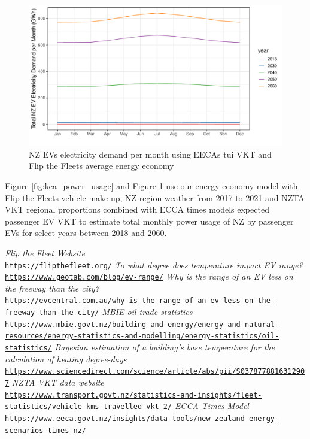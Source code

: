 \documentclass[
]{article}
\begin{document}
\begin{figure}
\centering
\includegraphics{final_report_files/figure-latex/tui_power_usage-1.pdf}
\caption{NZ EVs electricity demand per month using EECAs tui VKT and
Flip the Fleets average energy economy\label{fig:tui_power_usage}}
\end{figure}

Figure \ref{fig:kea_power_usage} and Figure \ref{fig:tui_power_usage}
use our energy economy model with Flip the Fleets vehicle make up, NZ
region weather from 2017 to 2021 and NZTA VKT regional proportions
combined with ECCA times models expected passenger EV VKT to estimate
total monthly power usage of NZ by passenger EVs for select years
between 2018 and 2060.

\begin{thebibliography}{9}
\textit{Flip the Fleet Website}
\\\texttt{https://flipthefleet.org/}
\textit{To what degree does temperature impact EV range?}
\\\texttt{\url{https://www.geotab.com/blog/ev-range/}}
\textit{Why is the range of an EV less on the freeway than the city?}
\\\texttt{\url{https://evcentral.com.au/why-is-the-range-of-an-ev-less-on-the-freeway-than-the-city/}}
\textit{MBIE oil trade statistics}
\\\texttt{\url{https://www.mbie.govt.nz/building-and-energy/energy-and-natural-resources/energy-statistics-and-modelling/energy-statistics/oil-statistics/}}
\textit{Bayesian estimation of a building's base temperature for the calculation of heating degree-days}
\\\texttt{\url{https://www.sciencedirect.com/science/article/abs/pii/S0378778816312907}}
\textit{NZTA VKT data website}
\\\texttt{\url{https://www.transport.govt.nz/statistics-and-insights/fleet-statistics/vehicle-kms-travelled-vkt-2/}}
\textit{ECCA Times Model}
\\\texttt{\url{https://www.eeca.govt.nz/insights/data-tools/new-zealand-energy-scenarios-times-nz/}}
\end{thebibliography}
\end{document}
